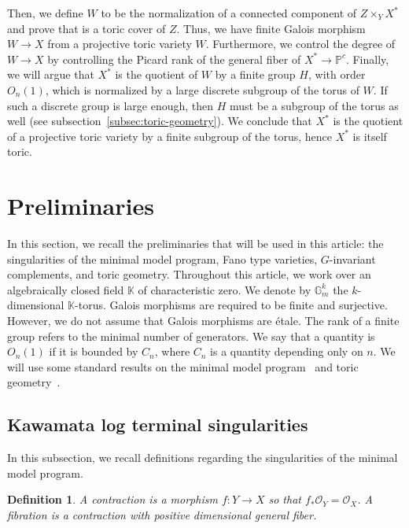\documentclass{amsart}
\newcommand{\pp}{\mathbb{P}}
\newtheorem{definition}[theorem]{Definition}
\theoremstyle{remark}
\numberwithin{equation}{section}
\begin{document}
Then, we define $W$ to be the normalization of a connected component of $Z\times_Y X^*$ and prove that is a toric cover of $Z$.
Thus, we have finite Galois morphism $W\rightarrow X$ from a projective toric variety $W$.
Furthermore, we control the degree of $W\rightarrow X$ by controlling the Picard rank of the general fiber of $X^*\rightarrow \pp^c$.
Finally, we will argue that $X^*$ is the quotient of $W$ by a finite group $H$, with order $O_n(1)$,
which is normalized by a large discrete subgroup of the torus of $W$.
If such a discrete group is large enough, then $H$ must be a subgroup of the torus as well (see subsection~\ref{subsec:toric-geometry}).
We conclude that $X^*$ is the quotient of a projective toric variety by a finite subgroup of the torus, hence $X^*$ is itself toric. 

\section{Preliminaries}

In this section, we recall the preliminaries that will be used in this article:
the singularities of the minimal model program,
Fano type varieties, $G$-invariant complements,
and toric geometry. 
Throughout this article, we work over an algebraically closed field $\mathbb{K}$ of characteristic zero.
We denote by $\mathbb{G}_m^k$ the $k$-dimensional $\mathbb{K}$-torus.
Galois morphisms are required to be finite and surjective.
However, we do not assume that Galois morphisms are \'etale.
The rank of a finite group refers to the minimal number of generators.
We say that a quantity is $O_n(1)$ if it is bounded by $C_n$, 
where $C_n$ is a quantity depending only on $n$.
We will use some standard results on the minimal model program~\cites{KM98,BCHM10} and toric geometry~\cites{Ful93,CLS11,Cox95}.

\subsection{Kawamata log terminal singularities}\label{subsec:klt}
In this subsection, we recall definitions regarding the singularities of the minimal model program.

\begin{definition}
{\em
A {\em contraction} is a morphism $f\colon Y\rightarrow X$
so that $f_*\mathcal{O}_Y=\mathcal{O}_X$.
A {\em fibration} is a contraction with positive dimensional general fiber.
}
\end{definition}
\end{document}
